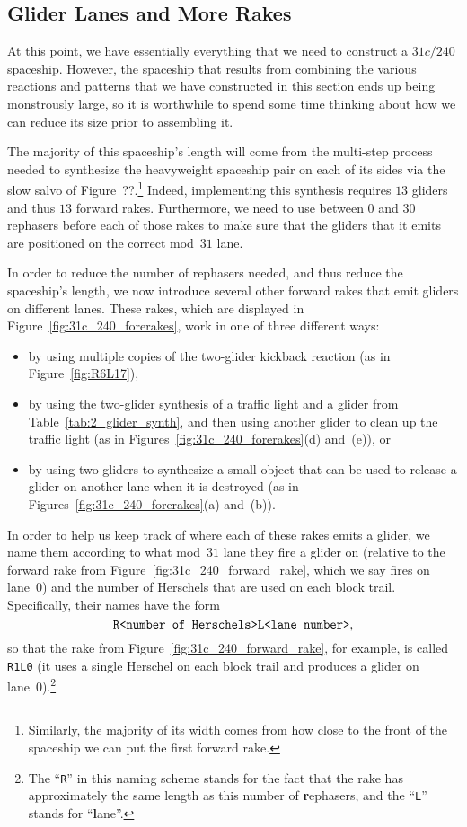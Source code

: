 \subsection{Glider Lanes and More Rakes}\label{sec:silverfish_more_rakes}

At this point, we have essentially everything that we need to construct a $31c/240$ spaceship. However, the spaceship that results from combining the various reactions and patterns that we have constructed in this section ends up being monstrously large, so it is worthwhile to spend some time thinking about how we can reduce its size prior to assembling it.

The majority of this spaceship's length will come from the multi-step process needed to synthesize the heavyweight spaceship pair on each of its sides via the slow salvo of Figure~??.\footnote{Similarly, the majority of its width comes from how close to the front of the spaceship we can put the first forward rake.} Indeed, implementing this synthesis requires $13$ gliders and thus $13$ forward rakes. Furthermore, we need to use between $0$ and $30$ rephasers before each of those rakes to make sure that the gliders that it emits are positioned on the correct mod~$31$ lane.

In order to reduce the number of rephasers needed, and thus reduce the spaceship's length, we now introduce several other forward rakes that emit gliders on different lanes. These rakes, which are displayed in Figure~\ref{fig:31c_240_forerakes}, work in one of three different ways:\smallskip

\begin{itemize}
	\item by using multiple copies of the two-glider kickback reaction (as in Figure~\ref{fig:R6L17}),\smallskip
	
	\item by using the two-glider synthesis of a traffic light and a glider from Table~\ref{tab:2_glider_synth}, and then using another glider to clean up the traffic light (as in Figures~\ref{fig:31c_240_forerakes}(d) and~(e)), or\smallskip
	
	\item by using two gliders to synthesize a small object that can be used to release a glider on another lane when it is destroyed (as in Figures~\ref{fig:31c_240_forerakes}(a) and~(b)).\smallskip
\end{itemize}

In order to help us keep track of where each of these rakes emits a glider, we name them according to what mod~$31$ lane they fire a glider on (relative to the forward rake from Figure~\ref{fig:31c_240_forward_rake}, which we say fires on lane~$0$) and the number of Herschels that are used on each block trail. Specifically, their names have the form
\[
	\text{\texttt{R<number of Herschels>L<lane number>}},
\]
so that the rake from Figure~\ref{fig:31c_240_forward_rake}, for example, is called \texttt{R1L0} (it uses a single Herschel on each block trail and produces a glider on lane~0).\footnote{The ``\texttt{R}'' in this naming scheme stands for the fact that the rake has approximately the same length as this number of \textbf{r}ephasers, and the ``\texttt{L}'' stands for ``\textbf{l}ane''.}

